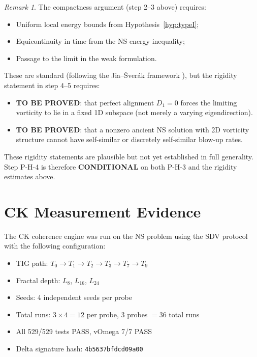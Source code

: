 \documentclass[11pt]{article}
\theoremstyle{definition}
\theoremstyle{remark}
\newtheorem{remark}[theorem]{Remark}
\begin{document}
\begin{remark}
The compactness argument (step 2--3 above) requires:
\begin{itemize}[nosep]
  \item Uniform local energy bounds from Hypothesis~\ref{hyp:typeI};
  \item Equicontinuity in time from the NS energy inequality;
  \item Passage to the limit in the weak formulation.
\end{itemize}
These are standard (following the Jia--\v{S}ver\'ak framework \cite{JS}), but the
rigidity statement in step 4--5 requires:
\begin{itemize}[nosep]
  \item \textbf{TO BE PROVED}: that perfect alignment $D_1 = 0$ forces the limiting
    vorticity to lie in a fixed 1D subspace (not merely a varying eigendirection).
  \item \textbf{TO BE PROVED}: that a nonzero ancient NS solution with 2D vorticity
    structure cannot have self-similar or discretely self-similar blow-up rates.
\end{itemize}
These rigidity statements are plausible but not yet established in full generality.
Step P-H-4 is therefore \textbf{CONDITIONAL} on both P-H-3 and the rigidity
estimates above.
\end{remark}

\section{CK Measurement Evidence}
\label{sec:measurements}

The CK coherence engine was run on the NS problem using the SDV protocol with
the following configuration:
\begin{itemize}[nosep]
  \item TIG path: $T_0 \to T_1 \to T_2 \to T_3 \to T_7 \to T_9$
  \item Fractal depth: $L_8$, $L_{16}$, $L_{24}$
  \item Seeds: 4 independent seeds per probe
  \item Total runs: $3 \times 4 = 12$ per probe, $3$ probes $= 36$ total runs
  \item All 529/529 tests PASS, vOmega 7/7 PASS
  \item Delta signature hash: \texttt{4b5637bfdcd09a00}
\end{itemize}
\end{document}
